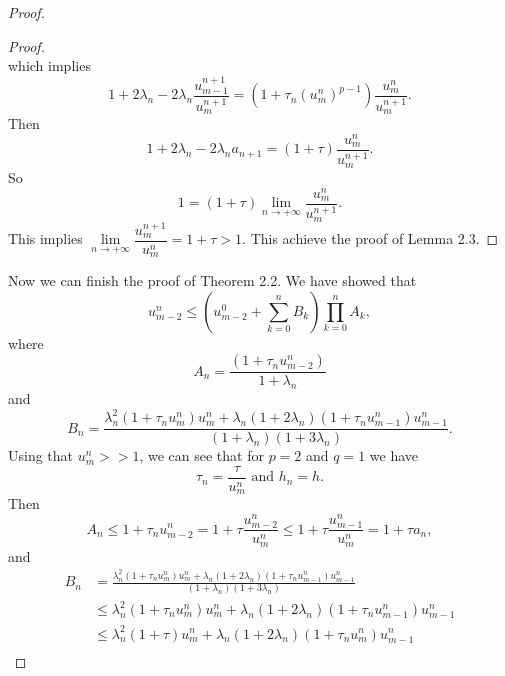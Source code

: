 \documentclass[a4paper,12pt,english,reqno]{smfart}
\begin{document}
\begin{proof}
\begin{proof}
\begin{equation*}
			\end{equation*}
			which implies
			\begin{equation*}
			1+2\lambda_{n}-2\lambda_{n}\frac{u_{m-1}^{n+1}}{u_{m}^{n+1}}=(1+\tau_{n}(u_{m}^{n})^{p-1})\frac{u_{m}^{n}}{u_{m}^{n+1}}. 
			\end{equation*}
			Then
			\begin{equation*}
			1+2\lambda_{n}-2\lambda_{n}a_{n+1}=(1+\tau)\frac{u_{m}^{n}}{u_{m}^{n+1}}. 
			\end{equation*}
			So
			\begin{equation*}
			1=(1+\tau)\lim_{n\rightarrow +\infty}\frac{u_{m}^{n}}{u_{m}^{n+1}}.
			\end{equation*}
			This implies  $\lim\limits_{n\rightarrow +\infty}\dfrac{u_{m}^{n+1}}{u_{m}^{n}}=1+\tau>1.$
			This achieve the proof of Lemma 2.3.
		\end{proof}
		Now we can finish the proof of Theorem 2.2. We have showed that
		\begin{equation*} 
		u_{m-2}^{n} \leq \left(u_{m-2}^{0}+\sum_{k=0}^{n}{ B_{k}}\right)\prod_{k=0}^{n}{A_{k}},
		\end{equation*}
		where 
		\begin{equation*}
		A_{n}=\frac{\left(1+\tau_{n}u_{m-2}^{n}\right)}{1+\lambda_{n}}
		\end{equation*}
		and 
		\begin{equation*}
		B_{n}=\frac{\lambda_{n}^{2}(1+\tau_{n}u_{m}^{n})u_{m}^{n}+\lambda_{n}(1+2\lambda_{n})(1+\tau_{n}u_{m-1}^{n})u_{m-1}^{n}}{(1+\lambda_{n})(1+3\lambda_{n})}.
		\end{equation*} 
		Using that $u_{m}^{n}>>1$, we can see that for $p=2$ and $q=1$ we have 
		\begin{equation*}
		\tau_{n}=\dfrac{\tau}{u_{m}^{n}} \text{ and } h_{n}=h.
		\end{equation*}
		Then
		\begin{equation*}
		A_{n} \leq 1+\tau_{n}u_{m-2}^{n}= 1+\tau \frac{u_{m-2}^{n}}{u_{m}^{n}}\leq 1+\tau \frac{u_{m-1}^{n}}{u_{m}^{n}}=1+\tau a_{n},
		\end{equation*} 
		and
		\begin{align*}
		B_{n}& =\frac{\lambda_{n}^{2}(1+\tau_{n}u_{m}^{n})u_{m}^{n}+\lambda_{n}(1+2\lambda_{n})(1+\tau_{n}u_{m-1}^{n})u_{m-1}^{n}}{(1+\lambda_{n})(1+3\lambda_{n})} \\
		& \leq \lambda_{n}^{2}(1+\tau_{n}u_{m}^{n})u_{m}^{n}+\lambda_{n}(1+2\lambda_{n})(1+\tau_{n}u_{m-1}^{n})u_{m-1}^{n}\\
		& \leq \lambda_{n}^{2}(1+\tau)u_{m}^{n}+\lambda_{n}(1+2\lambda_{n})(1+\tau_{n}u_{m}^{n})u_{m-1}^{n}\\

\end{align*}
\end{proof}
\end{document}
